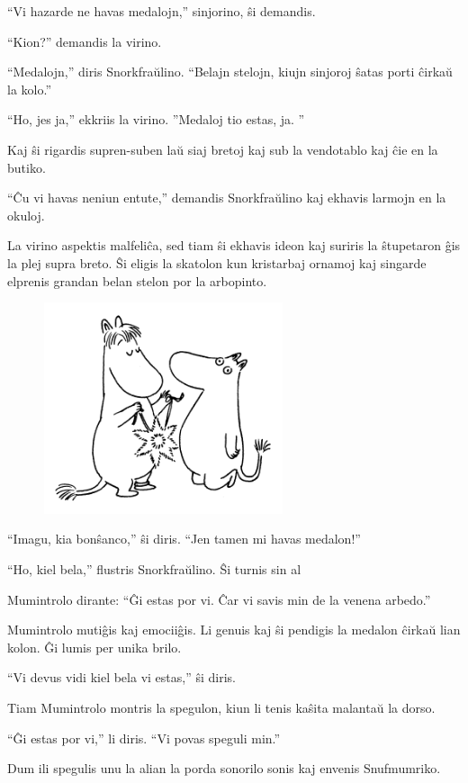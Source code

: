 ``Vi hazarde ne havas medalojn,'' sinjorino, ŝi demandis.

``Kion?'' demandis la virino.

``Medalojn,'' diris Snorkfraŭlino. ``Belajn stelojn, kiujn sinjoroj ŝatas porti ĉirkaŭ la kolo.''

``Ho, jes ja,'' ekkriis la virino. ''Medaloj tio estas, ja. ''

Kaj ŝi rigardis supren-suben laŭ siaj bretoj kaj sub la vendotablo kaj ĉie en la butiko.

``Ĉu vi havas neniun entute,'' demandis Snorkfraŭlino kaj ekhavis larmojn en la okuloj.

La virino aspektis malfeliĉa, sed tiam ŝi ekhavis ideon kaj suriris la ŝtupetaron ĝis la plej supra breto. Ŝi eligis la skatolon kun kristarbaj ornamoj kaj singarde elprenis grandan belan stelon por la arbopinto.

\begin{figure}[htbp]
\centering
\includegraphics[width=200pt,height=176pt]{6-4.png}
\caption{}
\label{6-4}
\end{figure}

``Imagu, kia bonŝanco,'' ŝi diris. ``Jen tamen mi havas medalon!''

``Ho, kiel bela,'' flustris Snorkfraŭlino. Ŝi turnis sin al

Mumintrolo dirante: ``Ĝi estas por vi. Ĉar vi savis min de la venena arbedo.''

Mumintrolo mutiĝis kaj emociiĝis. Li genuis kaj ŝi pendigis la medalon ĉirkaŭ lian kolon. Ĝi lumis per unika brilo.

``Vi devus vidi kiel bela vi estas,'' ŝi diris.

Tiam Mumintrolo montris la spegulon, kiun li tenis kaŝita malantaŭ la dorso.

``Ĝi estas por vi,'' li diris. ``Vi povas speguli min.''

Dum ili spegulis unu la alian la porda sonorilo sonis kaj envenis Snufmumriko.

